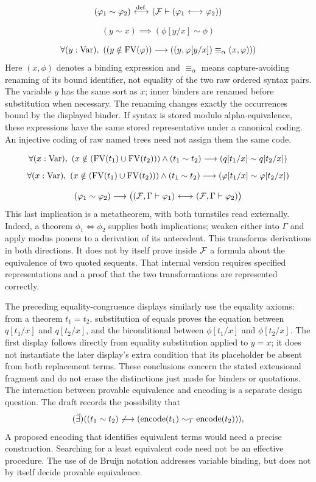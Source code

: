\[
(\varphi_1 \sim \varphi_2)
\ {\stackrel{{\textrm{def.}}}{\longleftrightarrow}}\ 
({\mathcal{F}}\vdash (\varphi_1{\ \longleftrightarrow\ }\varphi_2))
\]


\[
(y \sim x)
\implies
(\phi[y/x] \sim \phi)
\]

\[
\forall (y:\Var),\ %
(
(y\notin\FV(\phi))
\implies
((y,\phi[y/x]) \equiv_\alpha (x,\phi))
)
\]
Here $(x,\phi)$ denotes a binding expression and $\equiv_\alpha$
means capture-avoiding renaming of its bound identifier, not equality of
the two raw ordered syntax pairs. The variable $y$ has the same sort as
$x$; inner binders are renamed before substitution when necessary. The
renaming changes exactly the occurrences bound by the displayed binder.
If syntax is stored modulo alpha-equivalence, these expressions have
the same stored representative under a canonical coding. An injective
coding of raw named trees need not assign them the same code.

\[
\forall (x:\Var),\ %
(x\notin (\FV(t_1)\cup \FV(t_2)))
\land
(t_1 \sim t_2)
\implies
(q[t_1/x] \sim q[t_2/x])
\]
\[
\forall (x:\Var),\ %
(x\notin (\FV(t_1)\cup \FV(t_2)))
\land
(t_1 \sim t_2)
\implies
(\phi[t_1/x]\sim\phi[t_2/x])
\]

\[
(\varphi_1 \sim \varphi_2)
\longrightarrow
\bigl(({\mathcal{F}}, \Gamma\vdash\varphi_1) {\ \longleftrightarrow\ } ({\mathcal{F}}, \Gamma\vdash\varphi_2)\bigr)
\]
This last implication is a metatheorem, with both turnstiles read
externally. Indeed, a theorem $\phi_1\iff\phi_2$ supplies both
implications; weaken either into $\Gamma$ and apply modus ponens to a
derivation of its antecedent. This transforms derivations in both
directions. It does not by itself prove inside ${\mathcal{F}}$ a formula about
the equivalence of two quoted sequents. That internal version requires
specified representations and a proof that the two transformations are
represented correctly.

The preceding equality-congruence displays similarly use the equality
axioms: from a theorem $t_1=t_2$, substitution of equals proves the
equation between $q[t_1/x]$ and $q[t_2/x]$, and the biconditional between
$\phi[t_1/x]$ and $\phi[t_2/x]$. The first display follows directly
from equality substitution applied to $y=x$; it does not instantiate
the later display's extra condition that its placeholder be absent from
both replacement terms. These conclusions concern the stated
extensional fragment and do not erase the distinctions just made for
binders or quotations.
The interaction between provable equivalence and encoding is a separate
design question. The draft records the possibility that
\[
(\vec{\exists})((t_1 \sim t_2)
\not\longrightarrow
({\text{encode}}(t_1) \sim_{\mathcal{T}} {\text{encode}}(t_2))),
\]
A proposed encoding that identifies equivalent terms would need a precise
construction. Searching for a least equivalent code need not be an effective
procedure. The use of de Bruijn notation addresses variable binding, but does
not by itself decide provable equivalence.

